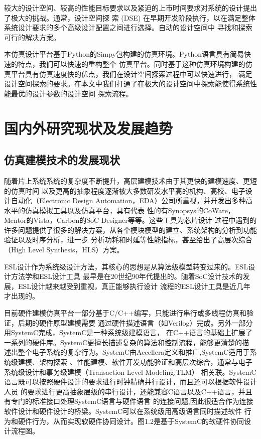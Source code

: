 较大的设计空间、较高的性能目标要求以及紧迫的上市时间要求对系统的设计提出了极大的挑战。通常，设计空间探
索 (DSE)\cite{5} 在早期开发阶段执行，以在满足整体系统设计要求的多个高级设计配置之间进行选择。自动的设计空间中
寻找和探索可行的解决方案。

本仿真设计平台基于Python的Simpy\cite{6}包构建的仿真环境。Python语言具有简易快速的特点，我们可以快速的重构整个
仿真平台。同时基于这种仿真环境构建的仿真平台具有仿真速度快的优点，我们在设计空间探索过程中可以快速进行，
满足设计空间探索的要求。在本文中我们打通了在极大的设计空间中探索能使得系统性能最优的设计参数的设计空间
探索流程。

\section{国内外研究现状及发展趋势}

\subsection{仿真建模技术的发展现状}
随着片上系统系统的复杂度不断提升，高层建模技术由于其更快的建模速度、更短的仿真时间
以及更高的抽象程度逐渐被大多数研发水平高的机构、高校、电子设计自动化（Electronic Design 
Automation，EDA）公司所重视，并开发出多种高水平的仿真模拟工具以及仿真平台，具有代表
性的有Synopsys的CoWare，Mentor的Vista，Carbon的SoC Designer等等。这些工具为芯片设计
过程中遇到的许多问题提供了很多的解决方案，从各个模块模型的建立、系统架构的分析到功能验证以及时序分析，进一步
分析功耗和时延等性能指标\cite{38}，甚至给出了高层次综合（High Level Synthesis，HLS）方案。

ESL设计作为系统级设计方法，其核心的思想是从算法级模型转变过来的。ESL设计方法学和ESL设计工具
最早是在20世纪90年代提出的。随着SoC设计技术的发展，ESL设计越来越受到重视，真正能够执行设计
流程的ESL设计工具是近几年才出现的。

目前硬件建模仿真平台一部分基于C/C++编写，只能进行串行或多线程仿真和验证，后期的硬件原型建模需要
通过硬件描述语言（如Verilog）完成。另外一部分用SystemC完成，SystemC\cite{7}是一种系统级建模语言，
在C++语言的基础上扩展了一系列的硬件库。SystemC更擅长描述复杂的算法和控制流程，能够更清楚的描
述出整个电子系统的复杂行为。SystemC由Accellera定义和推广,SystemC适用于系统级建模、架构探索
、性能建模、软件开发功能验证和高层次综合，通常与电子系统级设计和事务级建模（Transaction Level Modeling,TLM）
相关联。SystemC语言既可以按照硬件设计的要求进行时钟精确并行设计，而且还可以根据软件设计人员
的要求进行更高抽象层级的串行设计，还能兼容C语言以及C++语言，并且有专门的标准接口处理SystemC语言与硬件语言
的连接问题,因此很适合作为连接软件设计和硬件设计的桥梁\cite{37}。SystemC可以在系统级用高级语言同时描述软件
行为和硬件行为，从而实现软硬件协同设计\cite{40}。图1.2是基于SystemC的软硬件协同设计流程图。

